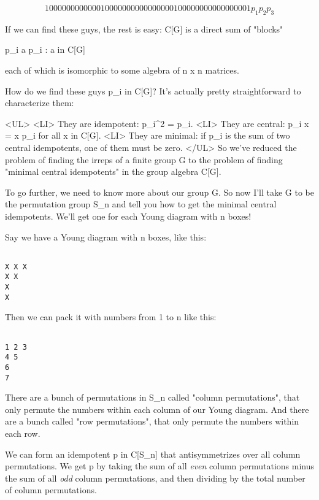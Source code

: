 $$

            1 0 0 0            0 0 0 0             0 0 0 0 
            0 1 0 0            0 0 0 0             0 0 0 0 
            0 0 0 0            0 0 1 0             0 0 0 0 
            0 0 0 0            0 0 0 0             0 0 0 1

              p_{1}                 p_{2}                  p_{3}
$$
    
If we can find these guys, the rest is easy: C[G] is a direct sum of
"blocks"

                    {p_{i} a p_{i} : a in C[G]}

each of which is isomorphic to some algebra of n x n matrices.

How do we find these guys p_{i} in C[G]?  It's actually pretty
straightforward to characterize them:

<UL>
<LI> They are idempotent: p_{i}^{2} = p_{i}.
<LI> They are central: p_{i} x = x p_{i} for all x in C[G].
<LI> They are minimal: if p_{i} is the sum of two central idempotents, one 
   of them must be zero.
</UL>
So we've reduced the problem of finding the irreps of a finite group G
to the problem of finding "minimal central idempotents" in the group 
algebra C[G].

To go further, we need to know more about our group G.  So now I'll take
G to be the permutation group S_{n} and tell you how to get the minimal
central idempotents.  We'll get one for each Young diagram with n boxes!

Say we have a Young diagram with n boxes, like this:


\begin{verbatim}

X X X
X X
X
X
\end{verbatim}
    
Then we can pack it with numbers from 1 to n like this:


\begin{verbatim}

1 2 3
4 5
6
7
\end{verbatim}
    
There are a bunch of permutations in S_{n} called "column
permutations", that only permute the numbers within each column of
our Young diagram.  And there are a bunch called "row
permutations", that only permute the numbers within each row.

We can form an idempotent p in C[S_{n}] that antisymmetrizes over all 
column permutations.  We get p by taking the sum of all \emph{even} column
permutations minus the sum of all \emph{odd} column permutations, and then
dividing by the total number of column permutations.

